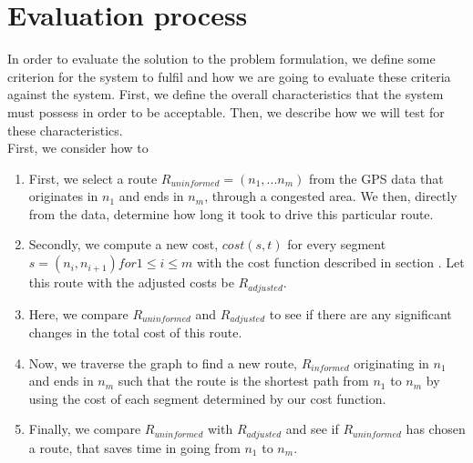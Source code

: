 \section{Evaluation process}
In order to evaluate the solution to the problem formulation, we define some criterion for the system to fulfil and how we are going to evaluate these criteria against the system. First, we define the overall characteristics that the system must possess in order to be acceptable. Then, we describe how we will test for these characteristics.
\\



First, we consider how to 
\begin{enumerate}
\item First, we select a route $R_{uninformed}=(n_1,...n_m)$ from the GPS data that originates in $n_1$ and ends in $n_m$, through a congested area. We then, directly from the data, determine how long it took to drive this particular route.
\item Secondly, we compute a new cost, $cost(s, t)$ for every segment $s=(n_i,n_{i+1}) for 1 \leq i \leq m$ with the cost function described in section . Let this route with the adjusted costs be $R_{adjusted}$.
\item Here, we compare $R_{uninformed}$ and $R_{adjusted}$ to see if there are any significant changes in the total cost of this route.
\item Now, we traverse the graph to find a new route, $R_{informed}$ originating in $n_1$ and ends in $n_m$ such that the route is the shortest path from $n_1$ to $n_m$ by using the cost of each segment determined by our cost function.
\item Finally, we compare $R_{uninformed}$ with $R_{adjusted}$ and see if $R_{uninformed}$ has chosen a route, that saves time in going from $n_1$ to $n_m$.
\end{enumerate}